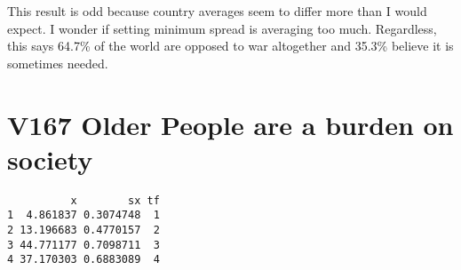 \documentclass{amsart}
\begin{document}
This result is odd because country averages seem to differ more than I would expect.  I wonder if setting minimum spread is averaging too much. Regardless, this says 64.7\% of the world are opposed to war altogether and 35.3\% believe it is sometimes needed.  

\section{V167 Older People are a burden on society}

\begin{verbatim}
          x        sx tf
1  4.861837 0.3074748  1
2 13.196683 0.4770157  2
3 44.771177 0.7098711  3
4 37.170303 0.6883089  4
\end{verbatim}
\end{document}
